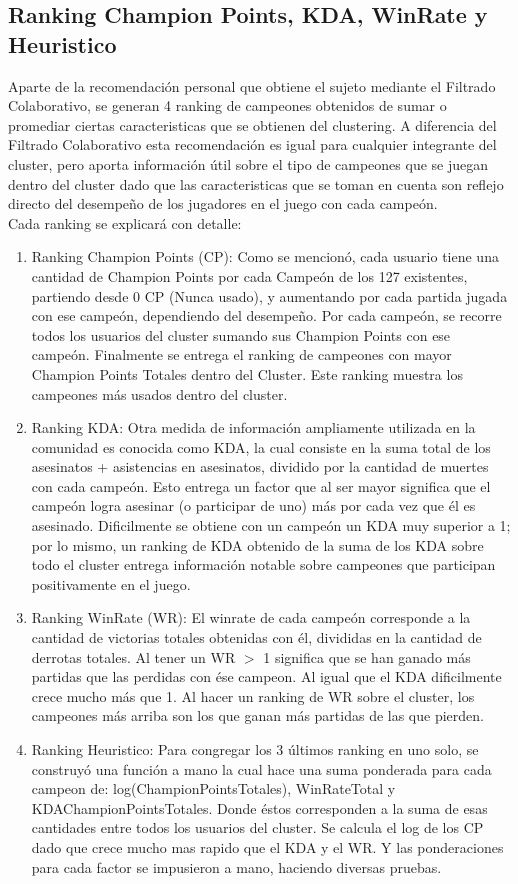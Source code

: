 \documentclass[letterpaper,11pt, spanish]{article}
\begin{document}
\subsection{Ranking Champion Points, KDA, WinRate y Heuristico}
Aparte de la recomendación personal que obtiene el sujeto mediante el Filtrado Colaborativo, se generan 4 ranking de campeones obtenidos de sumar o promediar ciertas caracteristicas que se obtienen del clustering. A diferencia del Filtrado Colaborativo esta recomendación es igual para cualquier integrante del cluster, pero aporta información útil sobre el tipo de campeones que se juegan dentro del cluster dado que las caracteristicas que se toman en cuenta son reflejo directo del desempeño de los jugadores en el juego con cada campeón.\\
Cada ranking se explicará con detalle:
\begin{enumerate}
	\item Ranking Champion Points (CP): Como se mencionó, cada usuario tiene una cantidad de Champion Points por cada Campeón de los 127 existentes, partiendo desde 0 CP (Nunca usado), y aumentando por cada partida jugada con ese campeón, dependiendo del desempeño. Por cada campeón, se recorre todos los usuarios del cluster sumando sus Champion Points con ese campeón. Finalmente se entrega el ranking de campeones con mayor Champion Points Totales dentro del Cluster. Este ranking muestra los campeones más usados dentro del cluster.

	\item Ranking KDA: Otra medida de información ampliamente utilizada en la comunidad es conocida como KDA, la cual consiste en la suma total de los asesinatos + asistencias en asesinatos, dividido por la cantidad de muertes con cada campeón. Esto entrega un factor que al ser mayor significa que el campeón logra asesinar (o participar de uno) más por cada vez que él es asesinado. Dificilmente se obtiene con un campeón un KDA muy superior a 1; por lo mismo, un ranking de KDA obtenido de la suma de los KDA sobre todo el cluster entrega información notable sobre campeones que participan positivamente en el juego.
	\item Ranking WinRate (WR): El winrate de cada campeón corresponde a la cantidad de victorias totales obtenidas con él, divididas en la cantidad de derrotas totales. Al tener un WR $>$ 1 significa que se han ganado más partidas que las perdidas con ése campeon. Al igual que el KDA dificilmente crece mucho más que 1. Al hacer un ranking de WR sobre el cluster, los campeones más arriba son los que ganan más partidas de las que pierden.
	\item Ranking Heuristico: Para congregar los 3 últimos ranking en uno solo, se construyó una función a mano la cual hace una suma ponderada para cada campeon de: log(ChampionPointsTotales), WinRateTotal y KDAChampionPointsTotales. Donde éstos  corresponden a la suma de esas cantidades entre todos los usuarios del cluster. Se calcula el log de los CP dado que crece mucho mas rapido que el KDA y el WR. Y las ponderaciones para cada factor se impusieron a mano, haciendo diversas pruebas.
\end{enumerate}
\end{document}
